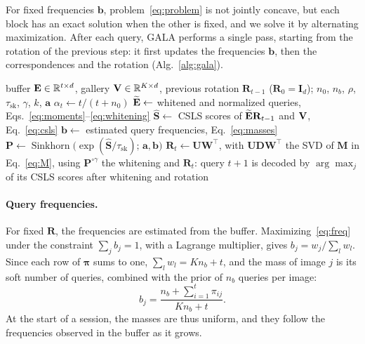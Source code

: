 For fixed frequencies $\mathbf{b}$, problem~\eqref{eq:problem} is not jointly concave, but each block has an exact solution when the other is fixed, and we
solve it by alternating maximization. After
each query, GALA performs a single pass, starting from the rotation of the
previous step: it first updates the frequencies $\mathbf{b}$, then the
correspondences and the rotation (Alg.~\ref{alg:gala}).
\begin{algorithm}[ht!]
\caption{Update of GALA after query $t$.}
\label{alg:gala}
\begin{algorithmic}[1]
\Require buffer ${\bf E} \in {\mathbb R}^{t\times d}$, gallery ${\bf V} \in {\mathbb R}^{K\times d}$, previous rotation $\mathbf{R}_{t-1}$ ($\mathbf{R}_0 = \mathbf{I}_d$);
         $n_0$, $n_b$, $\rho$, $\tau_{\mathrm{sk}}$, $\gamma$, $k$, $\mathbf{a}$
\State $\alpha_t \gets t/(t+n_0)$
\State $\widetilde{{\bf E}} \gets$ whitened and normalized queries, Eqs.~\eqref{eq:moments}--\eqref{eq:whitening}
\State $\widehat{\mathbf{S}} \gets$ CSLS scores of $\widetilde{{\bf E}}\mathbf{R}_{t-1}$ and ${\bf V}$, Eq.~\eqref{eq:csls}
\State $\mathbf{b} \gets$ estimated query frequencies, Eq.~\eqref{eq:masses}
\State $\mathbf{P} \gets \operatorname{Sinkhorn}\big(\exp(\widehat{\mathbf{S}}/\tau_{\mathrm{sk}});\,\mathbf{a},\mathbf{b}\big)$
\State $\mathbf{R}_t \gets \mathbf{U}\mathbf{W}^\top$, with $\mathbf{U}\mathbf{D}\mathbf{W}^\top$ the SVD of $\mathbf{M}$ in Eq.~\eqref{eq:M}, using $\mathbf{P}^{\circ\gamma}$
\State \Return the whitening and $\mathbf{R}_t$: query $t+1$ is decoded by $\arg\max_j$ of its CSLS scores after whitening and rotation
\end{algorithmic}
\end{algorithm}

\paragraph{Query frequencies.} For fixed $\mathbf{R}$, the frequencies are estimated
from the buffer. Maximizing~\eqref{eq:freq} under the constraint
$\sum_j b_j = 1$, with a Lagrange multiplier, gives $b_j = w_j / \sum_l w_l$. Since each row of $\boldsymbol{\pi}$
sums to one, $\sum_l w_l = K n_b + t$, and the mass of image $j$ is its soft
number of queries, combined with the prior of $n_b$ queries per image:
%
\begin{equation}
  b_j = \frac{n_b + \sum_{i=1}^{t}\pi_{ij}}{K n_b + t}.
  \label{eq:masses}
\end{equation}
%
At the start of a session, the masses are thus uniform, and they follow the
frequencies observed in the buffer as it grows.

